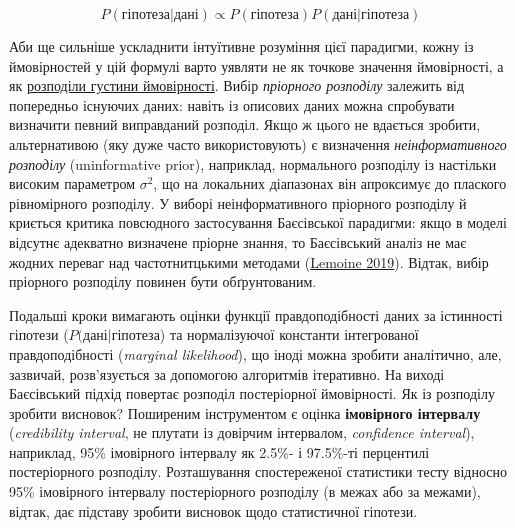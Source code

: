\documentclass[
  11pt,
]{book}
\begin{document}
\[P(\text{гіпотеза}|\text{дані}) \propto P(\text{гіпотеза})P(\text{дані}|\text{гіпотеза})\]

Аби ще сильніше ускладнити інтуїтивне розуміння цієї парадигми, кожну із ймовірностей у цій формулі варто уявляти не як точкове значення ймовірності, а як \hyperref[pdfs]{розподіли густини ймовірності}. Вибір \emph{пріорного розподілу} залежить від попередньо існуючих даних: навіть із описових даних можна спробувати визначити певний виправданий розподіл. Якщо ж цього не вдається зробити, альтернативою (яку дуже часто використовують) є визначення \emph{неінформативного розподілу} (uninformative prior), наприклад, нормального розподілу із настільки високим параметром \(\sigma^2\), що на локальних діапазонах він апроксимує до плаского рівномірного розподілу. У виборі неінформативного пріорного розподілу й криється критика повсюдного застосування Баєсівської парадигми: якщо в моделі відсутнє адекватно визначене пріорне знання, то Баєсівський аналіз не має жодних переваг над частотнитцькими методами (\href{https://doi.org/10.1111/oik.05985}{Lemoine 2019}). Відтак, вибір пріорного розподілу повинен бути обґрунтованим.

Подальші кроки вимагають оцінки функції правдоподібності даних за істинності гіпотези (\(P(\text{дані}|\text{гіпотеза}\)) та нормалізуючої константи інтегрованої правдоподібності (\emph{marginal likelihood}), що іноді можна зробити аналітично, але, зазвичай, розв'язується за допомогою алгоритмів ітеративно. На виході Баєсівський підхід повертає розподіл постеріорної ймовірності. Як із розподілу зробити висновок? Поширеним інструментом є оцінка \textbf{імовірного інтервалу} (\emph{credibility interval}, не плутати із довірчим інтервалом, \emph{confidence interval}), наприклад, 95\% імовірного інтервалу як 2.5\%- і 97.5\%-ті перцентилі постеріорного розподілу. Розташування спостереженої статистики тесту відносно 95\% імовірного інтервалу постеріорного розподілу (в межах або за межами), відтак, дає підставу зробити висновок щодо статистичної гіпотези.
\end{document}
